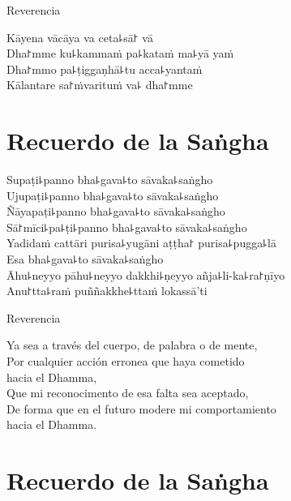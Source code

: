 \clearpage

\begin{instruction}
  Reverencia
\end{instruction}

Kāyena vācāya va ceta꜕sā꜓ vā\\
Dha꜓mme ku꜕kammaṁ pa꜕kataṁ ma꜕yā yaṁ\\
Dha꜓mmo pa꜕ṭiggaṇhā꜕tu acca꜕yantaṁ\\
Kālantare sa꜓ṁvarituṁ va꜕ dha꜓mme

\chapter*{Recuerdo de la Saṅgha}

\delegateSetUseNext

\begin{leader}
\end{leader}

Supaṭi꜕panno bha꜕gava꜕to sāvaka꜕saṅgho\\
Ujupaṭi꜕panno bha꜕gava꜕to sāvaka꜕saṅgho\\
Ñāyapaṭi꜕panno bha꜕gava꜕to sāvaka꜕saṅgho\\
Sā꜓mīci꜕pa꜕ṭi꜕panno bha꜕gava꜕to sāvaka꜕saṅgho\\
Yadidaṁ cattāri purisa꜕yugāni aṭṭha꜓ purisa꜕pugga꜕lā\\
Esa bha꜕gava꜕to sāvaka꜕saṅgho\\
Āhu꜕neyyo pāhu꜕neyyo dakkhi꜕ṇeyyo añja꜕li-ka꜕ra꜓ṇīyo\\
Anu꜓tta꜕raṁ puññakkhe꜕ttaṁ lokassā'ti

\clearpage

\begin{instruction}
  Reverencia
\end{instruction}

Ya sea a través del cuerpo, de palabra o de  mente,\\
Por cualquier acción erronea que haya cometido\\
\vin hacia el Dhamma,\\
Que mi reconocimento de esa falta sea aceptado,\\
De forma que en el futuro modere mi comportamiento\\
\vin hacia el Dhamma.

\chapter{Recuerdo de la Saṅgha}

